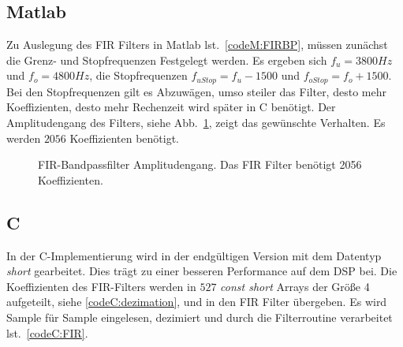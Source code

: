 \documentclass{article}
\begin{document}
\subsection{Matlab}
Zu Auslegung des FIR Filters in Matlab lst.~\ref{codeM:FIRBP}, müssen zunächst die Grenz- und Stopfrequenzen Festgelegt werden.
Es ergeben sich $f_u = 3800Hz$ und $f_o = 4800Hz$, die Stopfrequenzen $f_{uStop} = f_u - 1500$ und $f_{oStop} = f_o + 1500$.
Bei den Stopfrequenzen gilt es Abzuwägen, umso steiler das Filter, desto mehr Koeffizienten, desto mehr Rechenzeit wird später in C
benötigt.
Der Amplitudengang des Filters, siehe Abb.~\ref{fig:fir_ampli}, zeigt das gewünschte Verhalten. Es werden $2056$ Koeffizienten benötigt.


\begin{figure}[!h]
    \label{fig:fir_ampli}
    \centering
    \def\svgscale{0.3}
    \def\svgwidth{\columnwidth}
    \caption{FIR-Bandpassfilter Amplitudengang. Das FIR Filter benötigt 2056 Koeffizienten.}
\end{figure}
%
%
\subsection{C}
In der C-Implementierung wird in der endgültigen Version mit dem Datentyp \textit{short} gearbeitet. 
Dies trägt zu einer besseren Performance auf dem DSP bei.
Die Koeffizienten des FIR-Filters werden in $527$ \textit{const short} Arrays der Größe 4 aufgeteilt, siehe \ref{codeC:dezimation},
und in den FIR Filter übergeben. Es wird Sample für Sample eingelesen, dezimiert und durch die Filterroutine verarbeitet lst.~\ref{codeC:FIR}.
\end{document}
